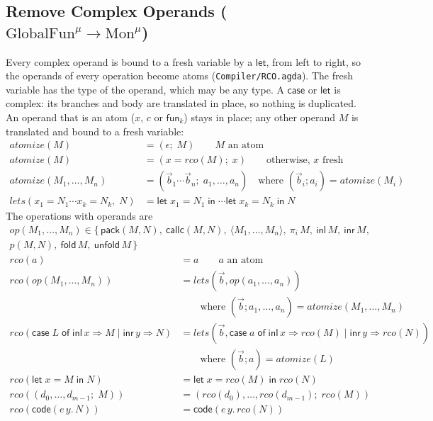 \documentclass[10pt]{article}
\theoremstyle{acmplain}
\newcommand{\key}[1]{\mathsf{#1}}
\newcommand{\pass}[1]{\mathit{#1}}
\newcommand{\Let}{\key{let}\;}
\newcommand{\In}{\;\key{in}\;}
\newcommand{\inl}{\key{inl}\,}
\newcommand{\inr}{\key{inr}\,}
\newcommand{\Case}[5]{\key{case}\;#1\;\key{of}\;\key{inl}\,#2 \Rightarrow #3 \mid \key{inr}\,#4 \Rightarrow #5}
\newcommand{\tuple}[1]{\langle #1 \rangle}
\newcommand{\prj}[1]{\pi_{#1}\,}
\newcommand{\funref}[1]{\key{fun}_{#1}}
\newcommand{\prim}[3]{#1(#2, #3)}
\newcommand{\Tcodetm}[3]{\key{code}(#1\,#2.\,#3)}  %
\newcommand{\Tpack}[2]{\key{pack}(#1, #2)}     %
\newcommand{\Tcallc}[2]{\key{callc}(#1, #2)}   %
\newcommand{\Ml}[1]{\textrm{#1}^{\mu}}                  %
\newcommand{\Mfold}{\key{fold}\,}
\newcommand{\Munfold}{\key{unfold}\,}
\begin{document}
\subsection{Remove Complex Operands (\texorpdfstring{$\Ml{GlobalFun} \to \Ml{Mon}$}{GlobalFun-mu -> Mon-mu})}

Every complex operand is bound to a fresh variable by a $\key{let}$, from
left to right, so the operands of every operation become atoms
(\texttt{Compiler/RCO.agda}). The fresh variable has the type of the
operand, which may be any type. A $\key{case}$ or $\key{let}$ is complex:
its branches and body are translated in place, so nothing is duplicated.
An operand that is an atom ($x$, $c$ or $\funref{k}$) stays in place; any
other operand $M$ is translated and bound to a fresh variable:
\begin{align*}
  \pass{atomize}(M) &= (\epsilon;\; M) \qquad M \text{ an atom} \\
  \pass{atomize}(M) &= (x{=}\pass{rco}(M);\; x) \qquad \text{otherwise, } x \text{ fresh} \\
  \pass{atomize}(M_1, \ldots, M_n) &= (\vec{b}_1 \cdots \vec{b}_n;\; a_1, \ldots, a_n)
    \quad\text{where } (\vec{b}_i; a_i) = \pass{atomize}(M_i) \\
  \pass{lets}(x_1{=}N_1 \cdots x_k{=}N_k,\; N) &= \Let x_1 = N_1 \In \cdots \Let x_k = N_k \In N
\end{align*}
The operations with operands are
\begin{multline*}
  \mathit{op}(M_1, \ldots, M_n) \in \{\, \Tpack{M}{N},\ \Tcallc{M}{N},\
     \tuple{M_1, \ldots, M_n},\ \prj{i} M,\ \inl M,\ \inr M, \\
     \prim{p}{M}{N},\ \Mfold M,\ \Munfold M \,\}
\end{multline*}
\begin{align*}
  \pass{rco}(a) &= a \qquad a \text{ an atom} \\
  \pass{rco}(\mathit{op}(M_1, \ldots, M_n)) &= \pass{lets}(\vec{b}, \mathit{op}(a_1, \ldots, a_n)) \\
  &\qquad \text{where } (\vec{b}; a_1, \ldots, a_n) = \pass{atomize}(M_1, \ldots, M_n) \\
  \pass{rco}(\Case{L}{x}{M}{y}{N}) &= \pass{lets}(\vec{b}, \Case{a}{x}{\pass{rco}(M)}{y}{\pass{rco}(N)}) \\
  &\qquad \text{where } (\vec{b}; a) = \pass{atomize}(L) \\
  \pass{rco}(\Let x = M \In N) &= \Let x = \pass{rco}(M) \In \pass{rco}(N) \\
  \pass{rco}((d_0, \ldots, d_{m-1};\; M)) &= (\pass{rco}(d_0), \ldots, \pass{rco}(d_{m-1});\; \pass{rco}(M)) \\
  \pass{rco}(\Tcodetm{e}{y}{N}) &= \Tcodetm{e}{y}{\pass{rco}(N)}
\end{align*}
\end{document}
